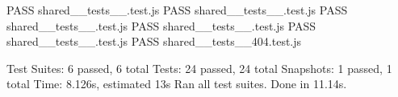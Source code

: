 PASS  shared\game\utils\collision\__tests__\quadtree.test.js
PASS  shared\game\utils\__tests__\spawn.test.js
PASS  shared\game\operations\__tests__\general.test.js
PASS  shared\game\operations\__tests__\player.test.js
PASS  shared\game\utils\collision\__tests__\grid.test.js
PASS  shared\components\App{}\__tests__\Error404.test.js

Test Suites: 6 passed, 6 total
Tests:       24 passed, 24 total
Snapshots:   1 passed, 1 total
Time:        8.126s, estimated 13s
Ran all test suites.
Done in 11.14s.